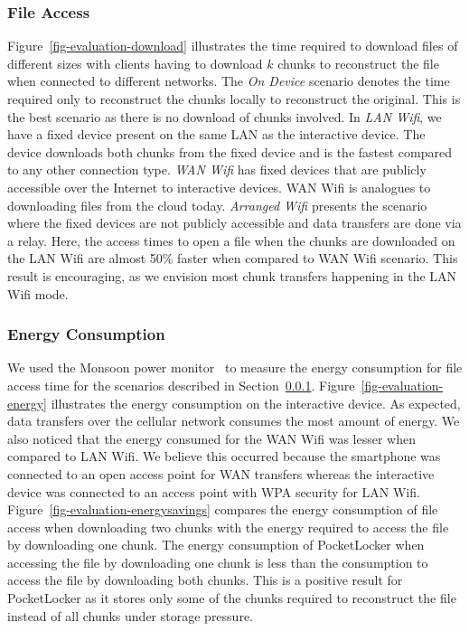 \subsubsection{File Access}
\label{sec-fileaccess}
Figure~\ref{fig-evaluation-download} illustrates the time required to download
files of different sizes with clients having to download $k$ chunks to
reconstruct the file when connected to different networks.
The \textit{On Device} scenario denotes the time required only to reconstruct the
chunks locally to reconstruct the original. This is the best scenario 
as there is no download of chunks involved.
In \textit{LAN Wifi}, we have a fixed device present on the same LAN as the 
interactive
device. The device downloads both chunks from the fixed device and is the
fastest compared to any other connection type. \textit{WAN Wifi} has fixed devices that are publicly accessible over the
Internet to interactive devices. WAN Wifi is analogues to downloading files from
the cloud today. \textit{Arranged Wifi} presents the scenario where the
fixed devices are not publicly accessible and data transfers are done via a
relay. Here, the access times to open a file when the chunks are
downloaded on the LAN Wifi are almost 50\% faster when compared to WAN Wifi
scenario. This result is encouraging, as we envision most chunk
transfers happening in the LAN Wifi mode. 

\subsubsection{Energy Consumption}
We used the Monsoon power monitor~\cite{monsoon} to measure the energy consumption for file
access time for the scenarios described in Section~\ref{sec-fileaccess}.
Figure~\ref{fig-evaluation-energy} illustrates the energy consumption on the
interactive device. As expected, data transfers over the cellular network 
consumes the most amount of
energy. We also noticed that the energy consumed for the WAN Wifi was lesser
when compared to LAN Wifi. We believe this occurred because
the smartphone was connected to an open access point for WAN transfers whereas
the interactive device was connected to an access point with WPA security for LAN
Wifi. Figure~\ref{fig-evaluation-energysavings} compares the energy consumption
of file access when downloading two chunks with the energy required to access
the file by downloading one chunk. The energy consumption of PocketLocker when
accessing the file by downloading one chunk is less than the consumption to access
the file by downloading both chunks. This is a positive result for
PocketLocker as it stores only some of the chunks required to reconstruct the 
file instead of all chunks under storage pressure.


